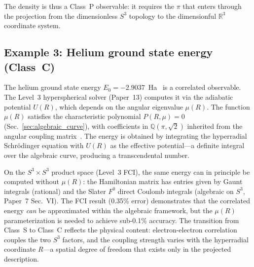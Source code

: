 \documentclass[aps,pra,twocolumn,superscriptaddress,longbibliography]{revtex4-2}
\begin{document}
The density is thus a Class~P observable: it requires the $\pi$
that enters through the projection from the dimensionless $S^3$
topology to the dimensionful $\mathbb{R}^3$ coordinate system.

\subsection{Example 3: Helium ground state energy (Class~C)}

The helium ground state energy $E_0 = -2.9037$~Ha~\cite{drake2006}
is a correlated observable.  The Level~3 hyperspherical solver
(Paper~13) computes it via the adiabatic potential $U(R)$, which
depends on the angular eigenvalue $\mu(R)$.  The function $\mu(R)$
satisfies the characteristic polynomial $P(R,\mu) = 0$
(Sec.~\ref{sec:algebraic_curve}), with coefficients in
$\mathbb{Q}(\pi, \sqrt{2})$ inherited from the angular coupling
matrix~\cite{loutey_track_p1}.  The energy is obtained by
integrating the hyperradial Schr\"odinger equation with
$U(R)$ as the effective potential---a definite integral over
the algebraic curve, producing a transcendental number.

On the $S^3 \times S^3$ product space (Level~3 FCI), the same
energy can in principle be computed without $\mu(R)$: the
Hamiltonian matrix has entries given by Gaunt integrals (rational)
and the Slater $F^0$ direct Coulomb integrals (algebraic on $S^3$,
Paper~7 Sec.~VI).  The FCI result (0.35\% error) demonstrates that
the correlated energy \emph{can} be approximated within the
algebraic framework, but the $\mu(R)$ parameterization is needed
to achieve sub-0.1\% accuracy.  The transition from Class~S to
Class~C reflects the physical content: electron-electron
correlation couples the two $S^3$ factors, and the coupling
strength varies with the hyperradial coordinate $R$---a spatial
degree of freedom that exists only in the projected description.
\end{document}
